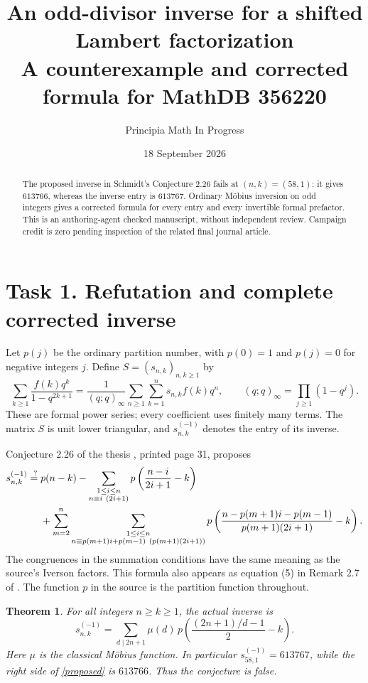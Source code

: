 \documentclass[11pt]{article}
\title{An odd-divisor inverse for a shifted Lambert factorization\\
\large A counterexample and corrected formula for MathDB 356220}
\author{Principia Math In Progress}
\date{18 September 2026}
\newtheorem{theorem}{Theorem}
\begin{document}
\maketitle
\begin{abstract}
The proposed inverse in Schmidt's Conjecture 2.26 fails at $(n,k)=(58,1)$:
it gives $613766$, whereas the inverse entry is $613767$.
Ordinary M\"obius inversion on odd integers gives a corrected formula for
every entry and every invertible formal prefactor.
This is an authoring-agent checked manuscript, without independent review.
Campaign credit is zero pending inspection of the related final journal article.
\end{abstract}

\section*{Task 1. Refutation and complete corrected inverse}
Let $p(j)$ be the ordinary partition number, with $p(0)=1$ and
$p(j)=0$ for negative integers $j$. Define $S=(s_{n,k})_{n,k\geq1}$ by
\begin{equation}\label{factor}
 \sum_{k\geq1}\frac{f(k)q^k}{1-q^{2k+1}}
 =\frac1{(q;q)_\infty}
   \sum_{n\geq1}\sum_{k=1}^n s_{n,k}f(k)q^n,
 \qquad (q;q)_\infty=\prod_{j\geq1}(1-q^j).
\end{equation}
These are formal power series; every coefficient uses finitely many terms.
The matrix $S$ is unit lower triangular, and $s^{(-1)}_{n,k}$ denotes
the entry of its inverse.

Conjecture 2.26 of the thesis \cite{thesis}, printed page 31, proposes
\begin{align}
 s^{(-1)}_{n,k}\stackrel{?}{={}}&
 p(n-k)-\sum_{\substack{1\leq i\leq n\\n\equiv i\ (2i+1)}}
 p\left(\frac{n-i}{2i+1}-k\right)\label{proposed}\\
 &+\sum_{m=2}^n
 \sum_{\substack{1\leq i\leq n\\
 n\equiv p(m+1)i+p(m-1)\ (p(m+1)(2i+1))}}
 p\left(\frac{n-p(m+1)i-p(m-1)}{p(m+1)(2i+1)}-k\right).\notag
\end{align}
The congruences in the summation conditions have the same meaning as the
source's Iverson factors. This formula also appears as equation (5) in
Remark 2.7 of \cite{preprint}. The function $p$ in the source is the
partition function throughout.

\begin{theorem}\label{main}
For all integers $n\geq k\geq1$, the actual inverse is
\begin{equation}\label{inverse}
 \boxed{\displaystyle
 s^{(-1)}_{n,k}
 =\sum_{d\mid 2n+1}\mu(d)\,
 p\left(\frac{(2n+1)/d-1}{2}-k\right).}
\end{equation}
Here $\mu$ is the classical M\"obius function.
In particular $s^{(-1)}_{58,1}=613767$, while the right side of
\eqref{proposed} is $613766$. Thus the conjecture is false.
\end{theorem}
\end{document}
